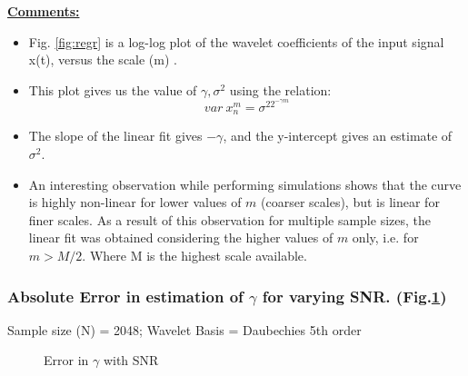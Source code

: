 \documentclass[a4paper]{article}
\begin{document}
\underline{\textbf{Comments:}}
\begin{itemize}
\item Fig. \ref{fig:regr} is a log-log plot of the wavelet coefficients of the input signal x(t), versus the scale (m) .
\item This plot gives us the value of $\gamma, \sigma^2 $ using the relation:
$$var\ x_n^m = \sigma^22^{-\gamma m}$$
\item The slope of the linear fit gives $-\gamma$, and the y-intercept gives an estimate of $\sigma^2 $.
\item An interesting observation while performing simulations shows that the curve is highly non-linear for lower values of $m$ (coarser scales), but is linear for finer scales. As a result of this observation for multiple sample sizes, the linear fit was obtained considering the higher values of $m$ only, i.e. for $m > M/2$. Where M is the highest scale available.

\end{itemize}
\subsubsection{Absolute Error in estimation of $\gamma$ for varying SNR. (Fig.\ref{fig:gamma_snr})}
Sample size (N) = 2048; Wavelet Basis = Daubechies 5th order

\begin{figure}[h]
    \centering
   \qquad
    \caption{Error in $\gamma$ with SNR}%
    \label{fig:gamma_snr}%
\end{figure}
\end{document}
